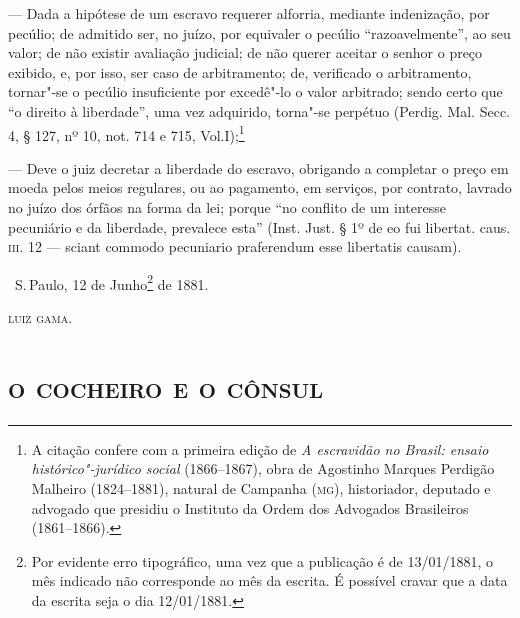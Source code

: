 --- Dada a hipótese de um escravo requerer alforria, mediante
indenização, por pecúlio; de admitido ser, no juízo, por equivaler o
pecúlio ``razoavelmente'', ao seu valor; de não existir avaliação
judicial; de não querer aceitar o senhor o preço exibido, e, por isso,
ser caso de arbitramento; de, verificado o arbitramento, tornar"-se o
pecúlio insuficiente por excedê"-lo o valor arbitrado; sendo certo que ``o
direito à liberdade'', uma vez adquirido, torna"-se perpétuo (Perdig. Mal.
Secc. 4, § 127, nº 10, not. 714 e 715, Vol.I);\footnote{A citação
  confere com a primeira edição de \emph{A escravidão no Brasil: ensaio
  histórico"-jurídico social} (1866--1867), obra de Agostinho Marques
  Perdigão Malheiro (1824--1881), natural de Campanha (\textsc{mg}), historiador,
  deputado e advogado que presidiu o Instituto da Ordem dos Advogados
  Brasileiros (1861--1866).}

--- Deve o juiz decretar a liberdade do escravo, obrigando a completar
o preço em moeda pelos meios regulares, ou ao pagamento, em serviços,
por contrato, lavrado no juízo dos órfãos na forma da lei; porque ``no
conflito de um interesse pecuniário e da liberdade, prevalece esta''
(Inst. Just. § 1º de eo fui libertat. caus. \textsc{iii}. 12 --- sciant commodo
pecuniario praferendum esse libertatis causam).

\bigskip

\hfill\ S.\,Paulo, 12 de Junho\footnote{Por evidente erro tipográfico, uma
    vez que a publicação é de 13/01/1881, o mês indicado não corresponde
    ao mês da escrita. É possível cravar que a data da escrita seja o
    dia 12/01/1881.} de 1881.\smallskip

\hfill\textsc{luiz gama.}

\begingroup\makeatletter\@openrightfalse
\part{\textsc{o cocheiro e o cônsul}}

\pagebreak
\mbox{}\vfill
\thispagestyle{empty}

